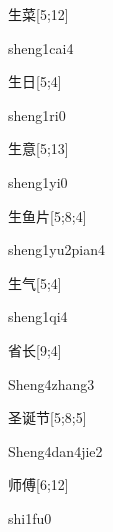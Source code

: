\begin{verbete}{生菜}[5;12]
\begin{pronuncia}{sheng1cai4}
\end{pronuncia}
\end{verbete}

\begin{verbete}[sheng1ri0]{生日}[5;4]
\begin{pronuncia}{sheng1ri0}
\end{pronuncia}
\end{verbete}

\begin{verbete}[sheng1yi0]{生意}[5;13]
\begin{pronuncia}{sheng1yi0}
\end{pronuncia}
\end{verbete}

\begin{verbete}{生鱼片}[5;8;4]
\begin{pronuncia}{sheng1yu2pian4}
\end{pronuncia}
\end{verbete}

\begin{verbete}[sheng1qi4]{生气}[5;4]
\begin{pronuncia}{sheng1qi4}
\end{pronuncia}
\end{verbete}

\begin{verbete}{省长}[9;4]
\begin{pronuncia}{Sheng4zhang3}
\end{pronuncia}
\end{verbete}

\begin{verbete}{圣诞节}[5;8;5]
\begin{pronuncia}{Sheng4dan4jie2}
\end{pronuncia}
\end{verbete}

\begin{verbete}[shi1fu0]{师傅}[6;12]
\begin{pronuncia}{shi1fu0}
\end{pronuncia}
\end{verbete}

